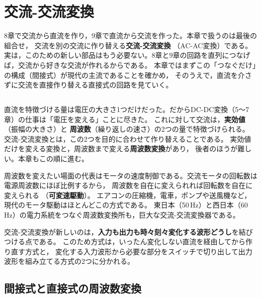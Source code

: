 \chapter{交流-交流変換}
\label{chap10}

8章で交流から直流を作り，9章で直流から交流を作った。本章で扱うのは最後の組合せ，
交流を別の交流に作り替える\textbf{交流-交流変換}
（AC-AC変換）である。
実は，このための新しい部品はもう必要ない。8章と9章の回路を直列につなげば，交流から好きな交流が作れるからである。
本章ではまずこの「つなぐだけ」の構成（間接式）が現代の主流であることを確かめ，
そのうえで，直流を介さずに交流を直接作り替える直接式の回路を見ていく。

\section{}
\label{sec10.1}

直流を特徴づける量は電圧の大きさ1つだけだった。だからDC-DC変換（5〜7章）の仕事は「電圧を変える」ことに尽きた。
これに対して交流は，\textbf{実効値}（振幅の大きさ）と
\textbf{周波数}（繰り返しの速さ）の2つの量で特徴づけられる。
交流-交流変換とは，この2つを目的に合わせて作り替えることである。
実効値だけを変える変換と，周波数まで変える\textbf{周波数変換}があり，
後者のほうが難しい。本章もこの順に進む。

周波数を変えたい場面の代表はモータの速度制御である。交流モータの回転数は電源周波数にほぼ比例するから，
周波数を自在に変えられれば回転数を自在に変えられる
（\textbf{可変速駆動}）。
エアコンの圧縮機，電車，ポンプや送風機など，現代のモータ駆動はほとんどこの方式である。
東日本（50\,Hz）と西日本（60\,Hz）の電力系統をつなぐ周波数変換所も，巨大な交流-交流変換器である。

交流-交流変換が新しいのは，\textbf{入力も出力も時々刻々変化する波形どうし}を結びつける点である。
このため方式は，いったん変化しない直流を経由してから作り直す方式と，
変化する入力波形から必要な部分をスイッチで切り出して出力波形を組み立てる方式の2つに分かれる。

\section{間接式と直接式の周波数変換}
\label{sec10.2}

